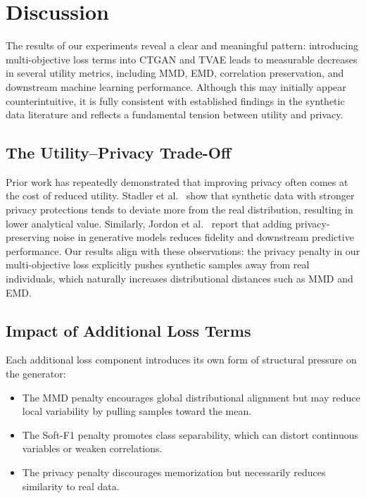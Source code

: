 \documentclass[11pt]{article}
\begin{document}
\section{Discussion}

The results of our experiments reveal a clear and meaningful pattern: introducing multi-objective loss terms into CTGAN and TVAE leads to measurable decreases in several utility metrics, including MMD, EMD, correlation preservation, and downstream machine learning performance. Although this may initially appear counterintuitive, it is fully consistent with established findings in the synthetic data literature and reflects a fundamental tension between utility and privacy.

\subsection{The Utility--Privacy Trade-Off}

Prior work has repeatedly demonstrated that improving privacy often comes at the cost of reduced utility. Stadler et al.~\cite{stadler2022synthetic} show that synthetic data with stronger privacy protections tends to deviate more from the real distribution, resulting in lower analytical value. Similarly, Jordon et al.~\cite{jordon2018pategan} report that adding privacy-preserving noise in generative models reduces fidelity and downstream predictive performance. Our results align with these observations: the privacy penalty in our multi-objective loss explicitly pushes synthetic samples away from real individuals, which naturally increases distributional distances such as MMD and EMD.

\subsection{Impact of Additional Loss Terms}

Each additional loss component introduces its own form of structural pressure on the generator:

\begin{itemize}
    \item The MMD penalty encourages global distributional alignment but may reduce local variability by pulling samples toward the mean.
    \item The Soft-F1 penalty promotes class separability, which can distort continuous variables or weaken correlations.
    \item The privacy penalty discourages memorization but necessarily reduces similarity to real data.
\end{itemize}
\end{document}
